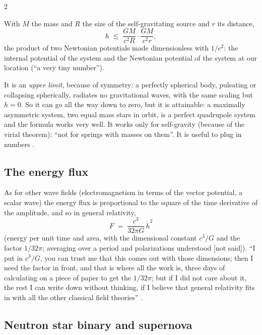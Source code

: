 \begin{paracol}{2}
\begin{proposition}\label{prop:c27-hmax}
With $M$ the mass and $R$ the size of the self-gravitating source and $r$ its distance,
\[
  h\;\lesssim\;\frac{GM}{c^2R}\cdot\frac{GM}{c^2r},
\]
the product of two Newtonian potentials made dimensionless with $1/c^2$: the internal potential of the system and the Newtonian potential of the system at our location (``a very tiny number'').
\end{proposition}

It is an \emph{upper limit}, because of symmetry: a perfectly spherical body, pulsating or collapsing spherically, radiates no gravitational waves, with the same scaling but $h=0$. So it can go all the way down to zero, but it is attainable: a maximally asymmetric system, two equal mass stars in orbit, is a perfect quadrupole system and the formula works very well. It works only for self-gravity (because of the virial theorem): ``not for springs with masses on them''. It is useful to plug in numbers .

\subsection{The energy flux}

As for other wave fields (electromagnetism in terms of the vector potential, a scalar wave) the energy flux is proportional to the square of the time derivative of the amplitude, and so in general relativity,
\[
  F\;=\;\frac{c^{3}}{32\pi G}\,\dot h^{2}
\]
(energy per unit time and area, with the dimensional constant $c^3/G$ and the factor $1/32\pi$; averaging over a period and polarizations understood [not said]). ``I put in $c^3/G$, you can trust me that this comes out with those dimensions; then I need the factor in front, and that is where all the work is, three days of calculating on a piece of paper to get the $1/32\pi$; but if I did not care about it, the rest I can write down without thinking, if I believe that general relativity fits in with all the other classical field theories'' .

\subsection{Neutron star binary and supernova}


\end{paracol}
